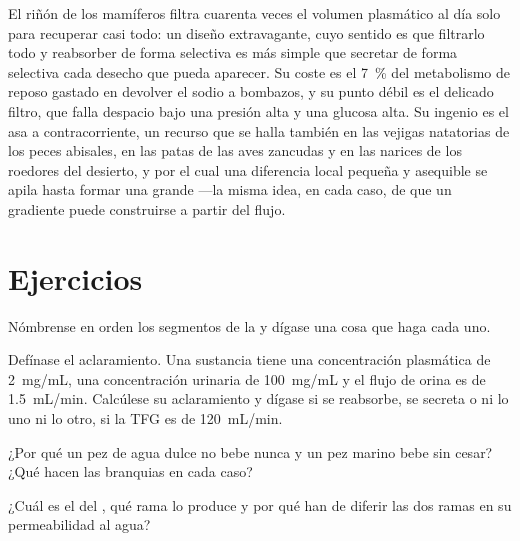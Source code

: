 \begin{remark}\label{rem:b3:renal-osmoregulation:design}
El riñón de los mamíferos filtra cuarenta veces el volumen plasmático
al día solo para recuperar casi todo: un diseño extravagante, cuyo
sentido es que filtrarlo todo y reabsorber de forma selectiva es más
simple que secretar de forma selectiva cada desecho que pueda aparecer.
Su coste es el \qty{7}{\%} del metabolismo de reposo gastado en
devolver el sodio a bombazos, y su punto débil es el delicado filtro,
que falla despacio bajo una presión alta y una glucosa alta. Su ingenio
es el asa a contracorriente, un recurso que se halla también en las
vejigas natatorias de los peces abisales, en las patas de las aves
zancudas y en las narices de los roedores del desierto, y por el cual
una diferencia local pequeña y asequible se apila hasta formar una
grande ---la misma idea, en cada caso, de que un gradiente puede
construirse a partir del flujo.
\end{remark}

\section{Ejercicios}

\begin{exercise}[$\star$]\label{exo:b3:renal-osmoregulation:1}
Nómbrense en orden los segmentos de la  y dígase una cosa que
haga cada uno.
\end{exercise}

\begin{exercise}[$\star$]\label{exo:b3:renal-osmoregulation:2}
Defínase el aclaramiento. Una sustancia tiene una concentración
plasmática de \qty{2}{mg/mL}, una concentración urinaria de
\qty{100}{mg/mL} y el flujo de orina es de \qty{1.5}{mL/min}. Calcúlese
su aclaramiento y dígase si se reabsorbe, se secreta o ni lo uno ni lo
otro, si la TFG es de \qty{120}{mL/min}.
\end{exercise}

\begin{exercise}[$\star$]\label{exo:b3:renal-osmoregulation:3}
¿Por qué un pez de agua dulce no bebe nunca y un pez marino bebe sin
cesar? ¿Qué hacen las branquias en cada caso?
\end{exercise}

\begin{exercise}[$\star$]\label{exo:b3:renal-osmoregulation:4}
¿Cuál es el  del , qué rama lo produce y por
qué han de diferir las dos ramas en su permeabilidad al agua?
\end{exercise}

